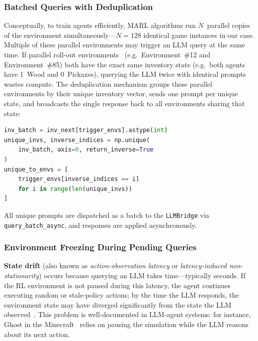 \subsubsection{Batched Queries with Deduplication}

Conceptually, to train agents efficiently, MARL algorithms run
$N$~parallel copies of the environment simultaneously---$N=128$
identical game instances in our case.
Multiple of these parallel environments may trigger an LLM query at
the same time.
If parallel roll-out environments~\parencite{Albrecht_Christianos_Schäfer_2024} (e.g.\ Environment~\#12 and Environment~\#85) both have the exact same
inventory state (e.g.\ both agents have 1~Wood and 0~Pickaxes),
querying the LLM twice with identical prompts wastes compute.
The deduplication mechanism groups these parallel environments by their
unique inventory vector, sends one prompt per unique state, and
broadcasts the single response back to all environments sharing that
state:

\begin{lstlisting}[style=code, language=Python, caption={Inventory deduplication in \texttt{hrl\_train\_loop.py}.}, label={lst:dedup}]
inv_batch = inv_next[trigger_envs].astype(int)
unique_invs, inverse_indices = np.unique(
    inv_batch, axis=0, return_inverse=True
)
unique_to_envs = [
    trigger_envs[inverse_indices == i]
    for i in range(len(unique_invs))
]
\end{lstlisting}

All unique prompts are dispatched as a batch to the \texttt{LLMBridge}
via \texttt{query\_batch\_async}, and responses are applied asynchronously.

\subsubsection{Environment Freezing During Pending Queries}

\textbf{State drift} (also known as \emph{action-observation latency} or
\emph{latency-induced non-stationarity})
occurs because querying an LLM takes time---typically seconds.
If the RL environment is not paused during this latency, the agent
continues executing random or stale-policy actions; by the time the LLM
responds, the environment state may have diverged significantly from the
state the LLM observed~\parencite{Katsikopoulos_Engelbrecht_2003}.
This problem is well-documented in LLM-agent systems: for instance,
Ghost in the Minecraft~\parencite{Zhu_etal_2023}
relies on pausing the simulation while the LLM reasons about its
next action.

